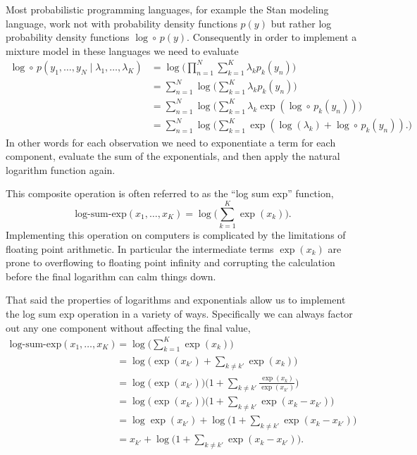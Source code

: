 \documentclass[
  letterpaper,
  DIV=11,
  numbers=noendperiod]{scrartcl}
\begin{document}
Most probabilistic programming languages, for example the Stan modeling
language, work not with probability density functions \(p(y)\) but
rather log probability density functions \(\log \circ \, p(y)\).
Consequently in order to implement a mixture model in these languages we
need to evaluate \begin{align*}
\log \circ \, p(y_{1}, \ldots, y_{N} \mid \lambda_{1}, \ldots, \lambda_{K})
&=
\log \bigg(
\prod_{n = 1}^{N} \sum_{k = 1}^{K} \lambda_{k} p_{k}(y_{n})
\bigg)
\\
&=
\sum_{n = 1}^{N}
\log \bigg( \sum_{k = 1}^{K} \lambda_{k} p_{k}(y_{n}) \bigg)
\\
&=
\sum_{n = 1}^{N}
\log \bigg(
\sum_{k = 1}^{K} \lambda_{k} \exp( \log \circ \, p_{k}(y_{n}) )
\bigg)
\\
&=
\sum_{n = 1}^{N}
\log \bigg(
\sum_{k = 1}^{K} \exp( \log(\lambda_{k}) + \log \circ \, p_{k}(y_{n}) ).
\bigg)
\end{align*} In other words for each observation we need to exponentiate
a term for each component, evaluate the sum of the exponentials, and
then apply the natural logarithm function again.

This composite operation is often referred to as the ``log sum exp''
function, \[
\text{log-sum-exp}(x_{1}, \ldots, x_{K})
=
\log \bigg( \sum_{k = 1}^{K} \exp (x_{k}) \bigg).
\] Implementing this operation on computers is complicated by the
limitations of floating point arithmetic. In particular the intermediate
terms \(\exp(x_{k})\) are prone to overflowing to floating point
infinity and corrupting the calculation before the final logarithm can
calm things down.

That said the properties of logarithms and exponentials allow us to
implement the log sum exp operation in a variety of ways. Specifically
we can always factor out any one component without affecting the final
value, \begin{align*}
\text{log-sum-exp}(x_{1}, \ldots, x_{K})
&=
\log \bigg( \sum_{k = 1}^{K} \exp (x_{k}) \bigg)
\\
&=
\log \bigg( \exp (x_{k'}) + \sum_{k \ne k'} \exp (x_{k}) \bigg)
\\
&=
\log \bigg( \exp (x_{k'}) \bigg)
\bigg(1 + \sum_{k \ne k'} \frac{ \exp (x_{k}) }{ \exp (x_{k'}) } \bigg)
\\
&=
\log \bigg( \exp (x_{k'}) \bigg)
\bigg(1 + \sum_{k \ne k'} \exp (x_{k} - x_{k'}) \bigg)
\\
&=
\log \exp (x_{k'})
+ \log \bigg(1 + \sum_{k \ne k'} \exp (x_{k} - x_{k'}) \bigg)
\\
&=
x_{k'} + \log \bigg(1 + \sum_{k \ne k'} \exp (x_{k} - x_{k'}) \bigg).
\end{align*}
\end{document}
